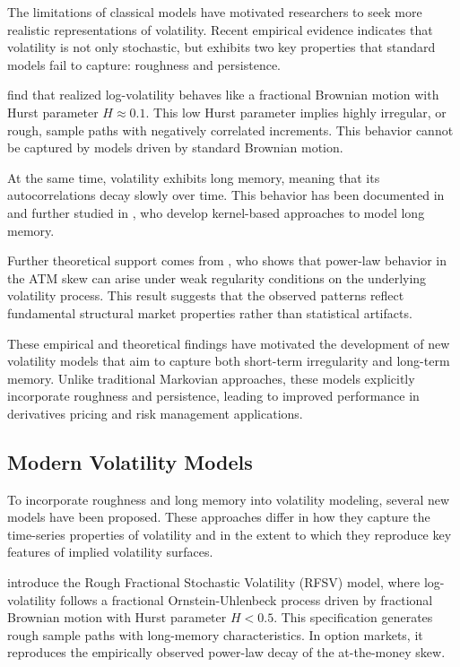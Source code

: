 The limitations of classical models have motivated researchers to seek more realistic representations of volatility. Recent empirical evidence indicates that volatility is not only stochastic, but exhibits two key properties that standard models fail to capture: roughness and persistence.

\citet{GatheralJaissonRosenbaum2018} find that realized log-volatility behaves like a fractional Brownian motion with Hurst parameter $H \approx 0.1$. This low Hurst parameter implies highly irregular, or rough, sample paths with negatively correlated increments. This behavior cannot be captured by models driven by standard Brownian motion.

At the same time, volatility exhibits long memory, meaning that its autocorrelations decay slowly over time. This behavior has been documented in \citet{ComteRenault1998} and further studied in \citet{BennedsenLundePakkanen2021}, who develop kernel-based approaches to model long memory.

Further theoretical support comes from \citet{Fukasawa2017}, who shows that power-law behavior in the ATM skew can arise under weak regularity conditions on the underlying volatility process. This result suggests that the observed patterns reflect fundamental structural market properties rather than statistical artifacts.

These empirical and theoretical findings have motivated the development of new volatility models that aim to capture both short-term irregularity and long-term memory. Unlike traditional Markovian approaches, these models explicitly incorporate roughness and persistence, leading to improved performance in derivatives pricing and risk management applications.


\subsection{Modern Volatility Models} \label{subsec:ModernVolModels}

To incorporate roughness and long memory into volatility modeling, several new models have been proposed. These approaches differ in how they capture the time-series properties of volatility and in the extent to which they reproduce key features of implied volatility surfaces.

\citet{GatheralJaissonRosenbaum2018} introduce the Rough Fractional Stochastic Volatility (RFSV) model, where log-volatility follows a fractional Ornstein-Uhlenbeck process driven by fractional Brownian motion with Hurst parameter $H < 0.5$. This specification generates rough sample paths with long-memory characteristics. In option markets, it reproduces the empirically observed power-law decay of the at-the-money skew.

